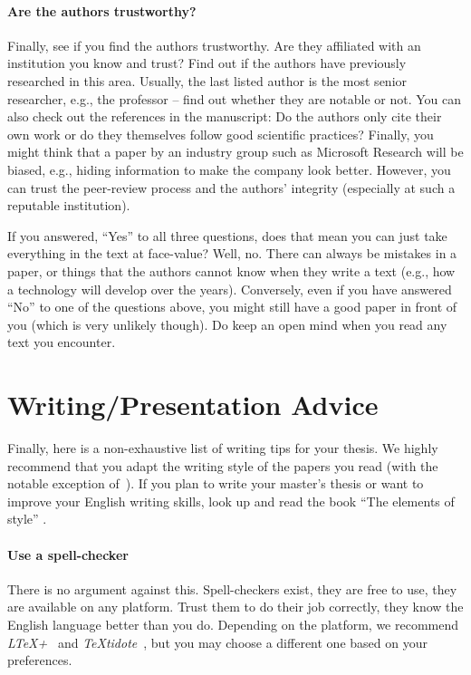 \documentclass[a4paper]{article}
\begin{document}
\paragraph{Are the authors trustworthy?}
Finally, see if you find the authors trustworthy.
Are they affiliated with an institution you know and trust?
Find out if the authors have previously researched in this area.
Usually, the last listed author is the most senior researcher, e.g., the professor -- find out whether they are notable or not.
You can also check out the references in the manuscript:
Do the authors only cite their own work or do they themselves follow good scientific practices?
Finally, you might think that a paper by an industry group such as Microsoft Research will be biased, e.g., hiding information to make the company look better.
However, you can trust the peer-review process and the authors' integrity (especially at such a reputable institution).

If you answered, ``Yes'' to all three questions, does that mean you can just take everything in the text at face-value?
Well, no.
There can always be mistakes in a paper, or things that the authors cannot know when they write a text (e.g., how a technology will develop over the years).
Conversely, even if you have answered ``No'' to one of the questions above, you might still have a good paper in front of you (which is very unlikely though).
Do keep an open mind when you read any text you encounter.

\section{Writing/Presentation Advice}
\label{sec:writing}

Finally, here is a non-exhaustive list of writing tips for your thesis.
We highly recommend that you adapt the writing style of the papers you read (with the notable exception of~\cite{lamport1998part}).
If you plan to write your master's thesis or want to improve your English writing skills, look up and read the book ``The elements of style'' \cite{strunkelements}.


\paragraph{Use a spell-checker}
There is no argument against this.
Spell-checkers exist, they are free to use, they are available on any platform.
Trust them to do their job correctly, they know the English language better than you do.
Depending on the platform, we recommend \emph{LTeX+}~\cite{ltex} and \emph{TeXtidote}~\cite{textidote}, but you may choose a different one based on your preferences.
\end{document}
